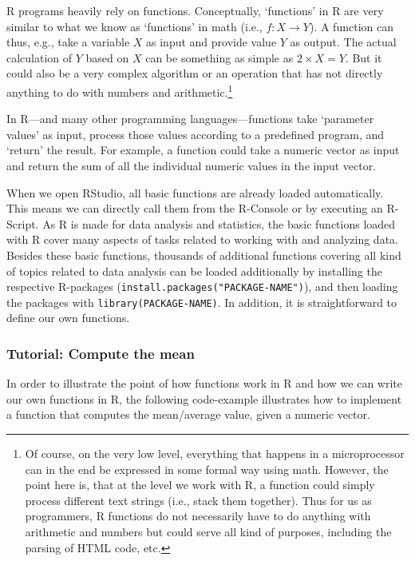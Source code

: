 \documentclass[
  12pt,
]{style/krantz}
\begin{document}
R programs heavily rely on functions. Conceptually, `functions' in R are very similar to what we know as `functions' in math (i.e., \(f:X \rightarrow Y\)). A function can thus, e.g., take a variable \(X\) as input and provide value \(Y\) as output. The actual calculation of \(Y\) based on \(X\) can be something as simple as \(2\times X = Y\). But it could also be a very complex algorithm or an operation that has not directly anything to do with numbers and arithmetic.\footnote{Of course, on the very low level, everything that happens in a microprocessor can in the end be expressed in some formal way using math. However, the point here is, that at the level we work with R, a function could simply process different text strings (i.e., stack them together). Thus for us as programmers, R functions do not necessarily have to do anything with arithmetic and numbers but could serve all kind of purposes, including the parsing of HTML code, etc.}

In R---and many other programming languages---functions take `parameter values' as input, process those values according to a predefined program, and `return' the result. For example, a function could take a numeric vector as input and return the sum of all the individual numeric values in the input vector.

When we open RStudio, all basic functions are already loaded automatically. This means we can directly call them from the R-Console or by executing an R-Script. As R is made for data analysis and statistics, the basic functions loaded with R cover many aspects of tasks related to working with and analyzing data. Besides these basic functions, thousands of additional functions covering all kind of topics related to data analysis can be loaded additionally by installing the respective R-packages (\texttt{install.packages("PACKAGE-NAME")}), and then loading the packages with \texttt{library(PACKAGE-NAME)}. In addition, it is straightforward to define our own functions.

\hypertarget{tutorial-compute-the-mean}{%
\subsubsection{Tutorial: Compute the mean}\label{tutorial-compute-the-mean}}

In order to illustrate the point of how functions work in R and how we can write our own functions in R, the following code-example illustrates how to implement a function that computes the mean/average value, given a numeric vector.
\end{document}
